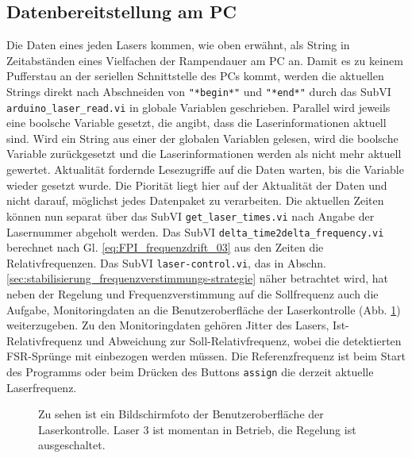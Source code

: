 \subsection{Datenbereitstellung am PC}\label{subsec:datenbereitstellung}
Die Daten eines jeden Lasers kommen, wie oben erwähnt, als String in
Zeitabständen eines Vielfachen der Rampendauer am PC an. Damit es zu keinem Pufferstau an
der seriellen Schnittstelle des PCs kommt, werden die aktuellen Strings direkt
nach Abschneiden von \lstinline|"*begin*"| und \lstinline|"*end*"| durch das
SubVI \lstinline|arduino_laser_read.vi| in globale Variablen geschrieben.
Parallel wird jeweils eine boolsche Variable gesetzt, die angibt, dass die Laserinformationen aktuell sind. Wird ein String aus einer der
globalen Variablen gelesen, wird die boolsche Variable zurückgesetzt und die
Laserinformationen werden als nicht mehr aktuell gewertet. Aktualität fordernde
Lesezugriffe auf die Daten warten, bis die Variable wieder gesetzt wurde. Die
Piorität liegt hier auf der Aktualität der Daten und nicht darauf, möglichst
jedes Datenpaket zu verarbeiten. Die aktuellen Zeiten können nun separat über
das SubVI \lstinline|get_laser_times.vi| nach Angabe der Lasernummer abgeholt werden. Das SubVI \lstinline|delta_time2delta_frequency.vi| berechnet nach Gl. \eqref{eq:FPI_frequenzdrift_03} aus den Zeiten die Relativfrequenzen. Das SubVI \lstinline|laser-control.vi|, das in Abschn.
\ref{sec:stabilisierung_frequenzverstimmungs-strategie} näher betrachtet wird,
hat neben der Regelung und Frequenzverstimmung auf die Sollfrequenz auch die Aufgabe, Monitoringdaten an die Benutzeroberfläche der Laserkontrolle (Abb.
\ref{fig:benutzeroberflaeche_laserkontrolle}) weiterzugeben. Zu den
Monitoringdaten gehören Jitter des Lasers, Ist-Relativfrequenz und Abweichung
zur Soll-Relativfrequenz, wobei die detektierten FSR-Sprünge mit einbezogen
werden müssen. Die Referenzfrequenz ist beim Start des Programms oder beim
Drücken des Buttons \lstinline|assign| die derzeit aktuelle Laserfrequenz.
\begin{figure}[h]
 	\centering
	\caption[Benutzeroberfläche -
	Laserkontrolle]{Zu sehen ist ein Bildschirmfoto der Benutzeroberfläche
	der Laserkontrolle. Laser 3 ist
	momentan in Betrieb, die
	Regelung ist ausgeschaltet.}\label{fig:benutzeroberflaeche_laserkontrolle}
\end{figure}

